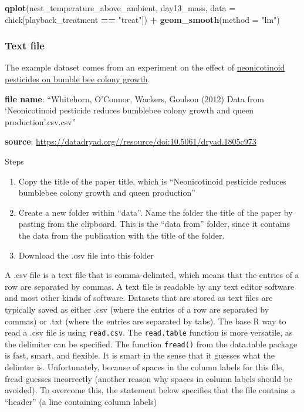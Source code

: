 \documentclass[]{book}
\newenvironment{Shaded}{\begin{snugshade}}{\end{snugshade}}
\newcommand{\DataTypeTok}[1]{\textcolor[rgb]{0.13,0.29,0.53}{#1}}
\newcommand{\KeywordTok}[1]{\textcolor[rgb]{0.13,0.29,0.53}{\textbf{#1}}}
\newcommand{\NormalTok}[1]{#1}
\newcommand{\OperatorTok}[1]{\textcolor[rgb]{0.81,0.36,0.00}{\textbf{#1}}}
\newcommand{\StringTok}[1]{\textcolor[rgb]{0.31,0.60,0.02}{#1}}
\providecommand{\tightlist}{%
  \setlength{\itemsep}{0pt}\setlength{\parskip}{0pt}}
\begin{document}
\begin{Shaded}
\begin{Highlighting}[]
\KeywordTok{qplot}\NormalTok{(nest_temperature_above_ambient, day13_mass, }\DataTypeTok{data =}\NormalTok{ chick[playback_treatment }\OperatorTok{==}\StringTok{ "treat"}\NormalTok{]) }\OperatorTok{+}\StringTok{ }\KeywordTok{geom_smooth}\NormalTok{(}\DataTypeTok{method =} \StringTok{"lm"}\NormalTok{)}
\end{Highlighting}
\end{Shaded}

\hypertarget{text-file}{%
\subsubsection{Text file}\label{text-file}}

The example dataset comes from an experiment on the effect of \href{http://science.sciencemag.org/content/early/2012/03/28/science.1215025}{neonicotinoid pesticides on bumble bee colony growth}.

\textbf{file name}: ``Whitehorn, O'Connor, Wackers, Goulson (2012) Data from `Neonicotinoid pesticide reduces bumblebee colony growth and queen production'.csv.csv''

\textbf{source}: \url{https://datadryad.org//resource/doi:10.5061/dryad.1805c973}

Steps

\begin{enumerate}
\def\labelenumi{\arabic{enumi}.}
\tightlist
\item
  Copy the title of the paper title, which is ``Neonicotinoid pesticide reduces bumblebee colony growth and queen production''
\item
  Create a new folder within ``data''. Name the folder the title of the paper by pasting from the clipboard. This is the ``data from'' folder, since it contains the data from the publication with the title of the folder.
\item
  Download the .csv file into this folder
\end{enumerate}

A .csv file is a text file that is comma-delimted, which means that the entries of a row are separated by commas. A text file is readable by any text editor software and most other kinds of software. Datasets that are stored as text files are typically saved as either .csv (where the entries of a row are separated by commas) or .txt (where the entries are separated by tabs). The base R way to read a .csv file is using \texttt{read.csv}. The \texttt{read.table} function is more versatile, as the delimiter can be specified. The function \texttt{fread()} from the data.table package is fast, smart, and flexible. It is smart in the sense that it guesses what the delimter is. Unfortunately, because of spaces in the column labels for this file, fread guesses incorrectly (another reason why spaces in column labels should be avoided). To overcome this, the statement below specifies that the file contains a ``header'' (a line containing column labels)
\end{document}

